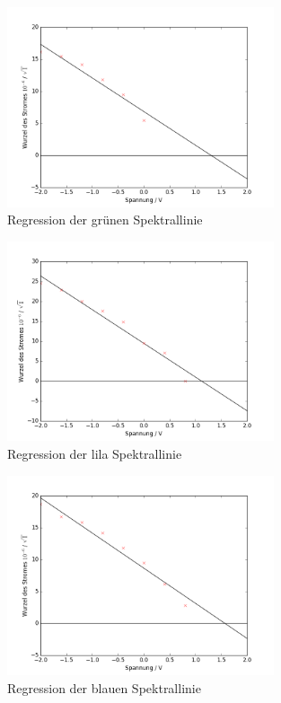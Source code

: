 \begin{figure}[h!]
	\centering
	\includegraphics[width=0.7\textwidth]{build/regression_Farbe:1.png}
	\caption{Regression der grünen Spektrallinie}
	\label{fig:regression_grun}
\end{figure}

\begin{figure}[h!]
	\centering
	\includegraphics[width=0.7\textwidth]{build/regression_Farbe:2.png}
	\caption{Regression der lila Spektrallinie}
	\label{fig:regression_lila}
\end{figure}

\begin{figure}[h!]
	\centering
	\includegraphics[width=0.7\textwidth]{build/regression_Farbe:3.png}
	\caption{Regression der blauen Spektrallinie}
	\label{fig:regression_blau}
\end{figure}

